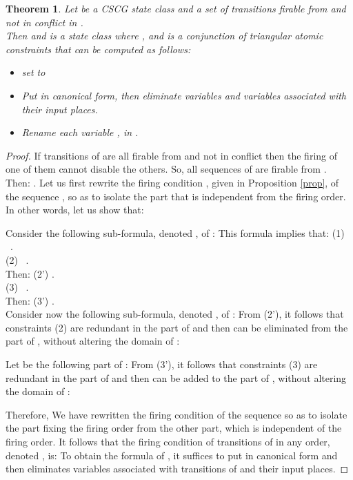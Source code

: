 \documentclass[submission,copyright,creativecommons]{eptcs}
\newtheorem{theorem}{Theorem}
\newtheorem{proof}{Proof}
\numberwithin{equation}{section}
\begin{document}
\begin{theorem} \label{th1}
Let  be a CSCG state class and  a set of transitions firable from  and not in conflict in .\\ Then  and  is a state class  where ,  and  is a conjunction of triangular atomic constraints that can be computed as follows:
\begin{itemize}
\item set  to 

\item Put  in canonical form, then eliminate variables  and variables associated with their input places. \item Rename each variable , in  .
\end{itemize}
\end{theorem}

 \begin{proof} If transitions of  are all firable from  and not in conflict then the firing of one of them cannot disable the others. So, all sequences of  are firable from . Then: .
Let us first rewrite the firing condition , given in Proposition \ref{prop}, of the sequence , so as to isolate the part that is independent from the firing order. In other words, let us show that:
     
Consider the following sub-formula, denoted , of : 
This formula implies that:
(1) \ . \\
(2) \ .\\ Then: (2') .\\
(3) \ .\\ Then: (3') .\\
Consider now the following sub-formula, denoted , of : 
From (2'), it follows that constraints (2) are redundant in the part  of  and then can be eliminated from the part  of , without altering the domain of :

Let  be the following part of : 
From (3'), it follows that constraints (3) are redundant in the part  of  and then can be added to the part  of , without altering the domain of :

Therefore,      
We have rewritten the firing condition of the sequence  so as to isolate the part   fixing the firing order from the other part, which is independent of the firing order. It follows that the firing condition of transitions of  in any order, denoted , is:    
To obtain the formula of , it suffices to put  in canonical form and then eliminates variables associated with transitions of  and their input places. \normalsize
 \end{proof}
\end{document}
